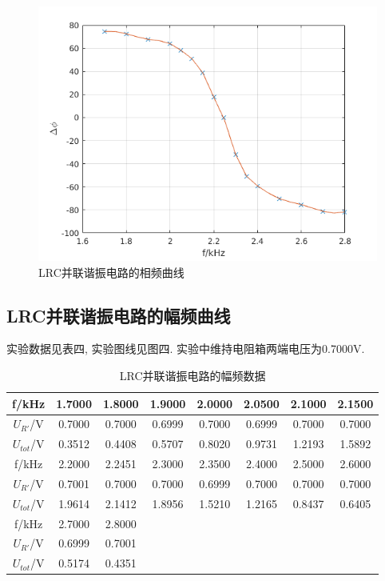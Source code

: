 \documentclass[a4paper,12pt,notitlepage]{article}
\begin{document}
\begin{figure}[H]
\centering
	\includegraphics[scale=0.7]{exp14_3.png}
	\caption{LRC并联谐振电路的相频曲线}
\end{figure}

\subsection{LRC并联谐振电路的幅频曲线}

	实验数据见表四, 实验图线见图四. 实验中维持电阻箱两端电压为0.7000V. \\

\begin{center}

	\begin{longtable}{|c|c|c|c|c|c|c|c|}
	\caption{LRC并联谐振电路的幅频数据} \\
	\hline
	f/kHz & 1.7000 & 1.8000 & 1.9000 & 2.0000 & 2.0500 & 2.1000 & 2.1500 \\
	\hline
	$U_{R'}$/V & 0.7000 & 0.7000 & 0.6999 & 0.7000 & 0.6999 & 0.7000 & 0.7000 \\
	\hline
	$U_{tot}$/V & 0.3512 & 0.4408 & 0.5707 & 0.8020 & 0.9731 & 1.2193 & 1.5892 \\
	\hline
	\hline
	f/kHz & 2.2000 & 2.2451 & 2.3000 & 2.3500 & 2.4000 & 2.5000 & 2.6000 \\
	\hline
	$U_{R'}$/V & 0.7001 & 0.7000 & 0.7000 & 0.6999 & 0.7000 & 0.7000 & 0.7000 \\
	\hline
	$U_{tot}$/V & 1.9614 & 2.1412 & 1.8956 & 1.5210 & 1.2165 & 0.8437 & 0.6405 \\
	\hline
	\hline
	f/kHz & 2.7000 & 2.8000 & & & & &  \\
	\hline
	$U_{R'}$/V & 0.6999 & 0.7001 & & & & & \\
	\hline
	$U_{tot}$/V & 0.5174 & 0.4351 & & & & & \\
	\hline
	\end{longtable}

\end{center}
\end{document}
